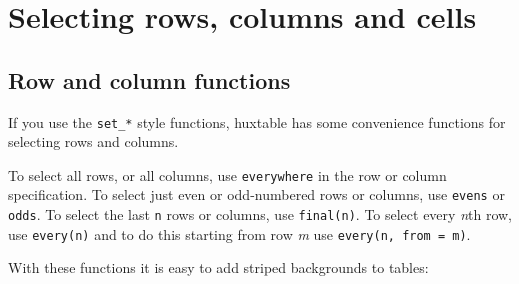 \documentclass[]{article}
\newenvironment{Shaded}{\begin{snugshade}}{\end{snugshade}}
\newcommand{\KeywordTok}[1]{\textcolor[rgb]{0.13,0.29,0.53}{\textbf{#1}}}
\newcommand{\DecValTok}[1]{\textcolor[rgb]{0.00,0.00,0.81}{#1}}
\newcommand{\StringTok}[1]{\textcolor[rgb]{0.31,0.60,0.02}{#1}}
\newcommand{\OtherTok}[1]{\textcolor[rgb]{0.56,0.35,0.01}{#1}}
\newcommand{\OperatorTok}[1]{\textcolor[rgb]{0.81,0.36,0.00}{\textbf{#1}}}
\newcommand{\NormalTok}[1]{#1}
\begin{document}
\FloatBarrier

\section{Selecting rows, columns and
cells}\label{selecting-rows-columns-and-cells}

\subsection{Row and column functions}\label{row-and-column-functions}

If you use the \texttt{set\_*} style functions, huxtable has some
convenience functions for selecting rows and columns.

To select all rows, or all columns, use \texttt{everywhere} in the row
or column specification. To select just even or odd-numbered rows or
columns, use \texttt{evens} or \texttt{odds}. To select the last
\texttt{n} rows or columns, use \texttt{final(n)}. To select every
\emph{n}th row, use \texttt{every(n)} and to do this starting from row
\emph{m} use \texttt{every(n,\ from\ =\ m)}.

With these functions it is easy to add striped backgrounds to tables:

\begin{Shaded}
\end{Shaded}
\end{document}
